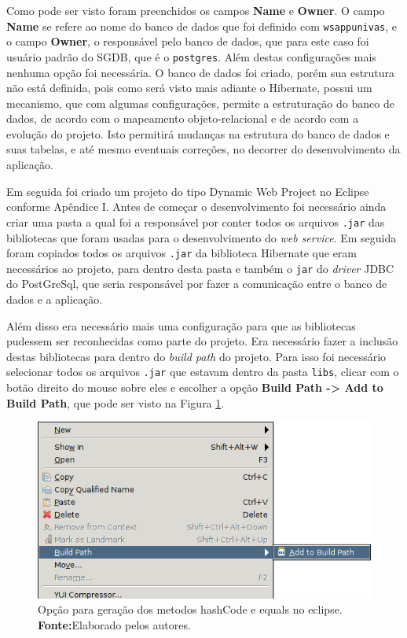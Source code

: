 	\par Como pode ser visto foram preenchidos os campos \textbf{Name} e
\textbf{Owner}. O campo \textbf{Name} se refere ao nome do banco de dados que
foi definido com \texttt{wsappunivas}, e o campo \textbf{Owner}, o responsável
pelo banco de dados, que para este caso foi usuário padrão do SGDB, que é o
\texttt{postgres}. Além destas configurações mais nenhuma opção foi necessária.
O banco de dados foi criado, porém sua estrutura não está definida, pois como
será visto mais adiante o Hibernate, possui um mecanismo, que com algumas
configurações, permite a estruturação do banco de dados, de acordo com o
mapeamento objeto-relacional e de acordo com a evolução do projeto. Isto
permitirá mudanças na estrutura do banco de dados e suas tabelas, e até mesmo
eventuais correções, no decorrer do desenvolvimento da aplicação.
	
	\par Em seguida foi criado um projeto do tipo Dynamic Web Project no
Eclipse conforme Apêndice I. Antes de começar o desenvolvimento foi necessário
ainda criar uma pasta a qual foi a responsável por conter todos os arquivos
\texttt{.jar} das bibliotecas que foram usadas para o desenvolvimento do
\textit{web service}. Em seguida foram copiados todos os arquivos \texttt{.jar}
da biblioteca Hibernate que eram necessários ao projeto, para dentro desta
pasta e também o \texttt{jar} do \textit{driver} JDBC do PostGreSql, que seria
responsável por fazer a comunicação entre o banco de dados e a aplicação.
	
	\par Além disso era necessário mais uma configuração para que as bibliotecas
pudessem ser reconhecidas como parte do projeto. Era necessário fazer a
inclusão destas bibliotecas para dentro do \textit{build path} do projeto. Para
isso foi necessário selecionar todos os arquivos \texttt{.jar} que estavam
dentro da pasta \texttt{libs}, clicar com o botão direito do mouse sobre eles e
escolher a opção \textbf{Build Path -> Add to Build Path}, que pode ser visto
na Figura \ref{fig:desws6_3}.

	\begin{figure}[h!]
		\centerline{\includegraphics[scale=0.8]{./imagens/2_q_metodologico/4_procedimentos_resultados/43_webservice/432_desenvolvimento/desws6_3.png}}
		\caption[Opção para geração dos metodos hashCode e equals no Eclipse]{Opção
		para geração dos metodos hashCode e equals no eclipse.
			\textbf{Fonte:}Elaborado pelos autores.}
		\label{fig:desws6_3}
	\end{figure}
	
